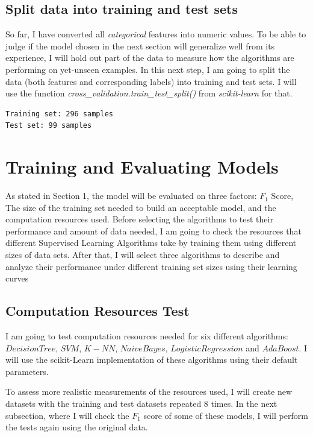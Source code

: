 \documentclass[a4paper]{article}
\begin{document}
\subsection{Split data into training and test sets}
So far, I have converted all \textit{categorical} features into numeric values. To be able to judge if the model chosen in the next section will generalize well from its experience, I will hold out part of the data to measure how the algorithms are performing on yet-unseen examples. In this next step, I am going to split the data (both features and corresponding labels) into training and test sets. I will use the function \textit{cross\_validation.train\_test\_split()} from \textit{scikit-learn} for that.

\begin{lstlisting}
Training set: 296 samples
Test set: 99 samples
\end{lstlisting}


\section{Training and Evaluating Models}
As stated in Section 1, the model will be evaluated on three factors: $F_1$ Score, The size of the training set needed to build an acceptable model, and the computation resources used. Before selecting the algorithms to test their performance and amount of data needed, I am going to check the resources that different Supervised Learning Algorithms take by training them using different sizes of data sets.  After that, I will select three algorithms to describe and analyze their performance under different training set sizes using their learning curves

\subsection{Computation Resources Test}
I am going to test computation resources needed for six different algorithms: $Decision Tree$, $SVM$, $K-NN$, $Naive Bayes$, $Logistic Regression$ and $AdaBoost$. I will use the scikit-Learn implementation of these algorithms using their default parameters.

To assess more realistic measurements of the resources used, I will create new datasets with the training and test datasets repeated 8 times. In the next subsection, where I will check the $F_1$ score of some of these models, I will perform the tests again using the original data.
\end{document}
